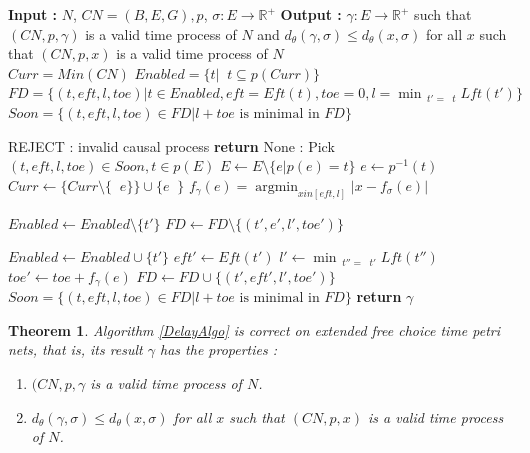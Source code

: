\documentclass{article}
\DeclareMathOperator*{\argmin}{argmin}
\DeclareMathOperator*{\pre}{^\bullet}
\newtheorem{theorem}{Theorem}
\theoremstyle{Definition}
\theoremstyle{definition}
\begin{document}
		\begin{algorithm}
		\caption{Naive $d_\theta$ Algorithm}
		\label{DelayAlgo}
		\begin{algorithmic}[1]
			
			\State \textbf{Input : }  $N$, $CN = (B, E, G), p$, $\sigma : E \to \mathbb{R}^+$
			\State \textbf{Output : }  $\gamma : E \to \mathbb{R}^+$ such that $(CN, p, \gamma)$ is a valid time process of $N$ and $d_\theta(\gamma, \sigma)  \leq  {d_\theta(x, \sigma)}$ for all $x$ such that $(CN, p, x)$ is a valid time process of $N$\\
			
			\State $Curr = Min(CN)$
			\State $Enabled = \{t | \pre t \subseteq p(Curr)\}$
			\State $FD = \{(t, eft, l, toe) | t \in Enabled, eft = Eft(t), toe = 0, l = \min_{\pre t' = \pre t}{Lft(t')}\}$
			\State $Soon = \{(t, eft, l, toe) \in FD | l+toe \textrm{ is minimal in } FD\}$
			
			\State REJECT : invalid causal process 
			\State \textbf{return} None  
			\Else : 
			\State Pick $(t, eft, l, toe) \in Soon, t \in p(E)$ 
			\State $E \gets E \setminus\{e | p(e) = t\}$
			\State $e \gets p^{-1}(t)$
			\State $Curr \gets \{Curr \setminus \{\pre e\}\} \cup \{e \pre\} $
			\State $f_{\gamma}(e) = \argmin_{x in [eft, l]}|x - f_{\sigma}(e)|$
			
			\ForAll{$t' \in T \wedge \pre t' = \pre t$} 
			\State $Enabled \gets Enabled \setminus\{t'\}$
			\State $FD \gets FD \setminus\{(t', e', l', toe')\}$
			\EndFor
			
			\ForAll{$t' \in T \wedge t' \pre = t \pre$}
			\State $Enabled \gets Enabled \cup \{t'\}$
			\State $eft' \gets Eft(t')$
			\State $l' \gets \min_{\pre t'' = \pre t'}{Lft(t'')}$
			\State $toe' \gets toe + f_\gamma(e)$
			\State $FD \gets FD \cup \{(t', eft', l', toe')\}$
			\EndFor
			\State $Soon = \{(t, eft, l, toe) \in FD | l+toe \textrm{ is minimal in } FD\}$
			\EndIf
			\EndWhile
			\State \textbf{return } $\gamma$
			
		\end{algorithmic}
	\end{algorithm}
	
	
	\begin{theorem}\label{DelayAlgoCorr} Algorithm \ref{DelayAlgo} is correct on extended free choice time petri nets, that is, its result $\gamma$ has the properties : 
		\begin{enumerate}
			\item $(CN, p, \gamma$ is a valid time process of $N$. 
			\item $d_\theta(\gamma, \sigma)  \leq  {d_\theta(x, \sigma)}$ for all $x$ such that $(CN, p, x)$ is a valid time process of $N$. 
		\end{enumerate}
	\end{theorem}
	
\end{document}
